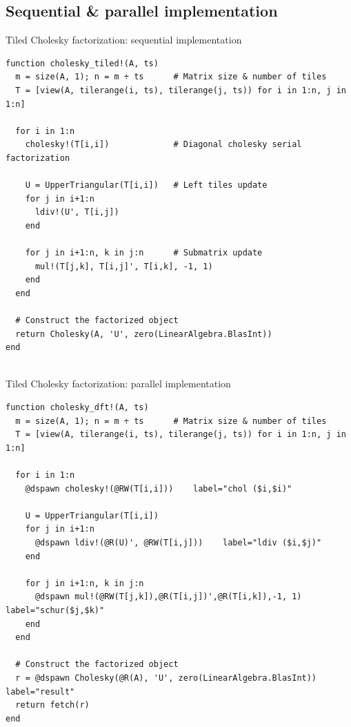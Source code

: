 \documentclass{beamer}
\begin{document}
\subsection{Sequential \& parallel implementation}

\begin{frame}[fragile]{Tiled Cholesky factorization: sequential implementation}
  \begin{verbatim}
function cholesky_tiled!(A, ts)
  m = size(A, 1); n = m ÷ ts      # Matrix size & number of tiles
  T = [view(A, tilerange(i, ts), tilerange(j, ts)) for i in 1:n, j in 1:n]

  for i in 1:n
    cholesky!(T[i,i])             # Diagonal cholesky serial factorization

    U = UpperTriangular(T[i,i])   # Left tiles update
    for j in i+1:n
      ldiv!(U', T[i,j])
    end

    for j in i+1:n, k in j:n      # Submatrix update
      mul!(T[j,k], T[i,j]', T[i,k], -1, 1)
    end
  end

  # Construct the factorized object
  return Cholesky(A, 'U', zero(LinearAlgebra.BlasInt))
end
  
  \end{verbatim}
\end{frame}


\begin{frame}[fragile]{Tiled Cholesky factorization: parallel implementation}
  \begin{verbatim}
function cholesky_dft!(A, ts)
  m = size(A, 1); n = m ÷ ts      # Matrix size & number of tiles
  T = [view(A, tilerange(i, ts), tilerange(j, ts)) for i in 1:n, j in 1:n]

  for i in 1:n
    @dspawn cholesky!(@RW(T[i,i]))    label="chol ($i,$i)"

    U = UpperTriangular(T[i,i])
    for j in i+1:n
      @dspawn ldiv!(@R(U)', @RW(T[i,j]))    label="ldiv ($i,$j)"
    end

    for j in i+1:n, k in j:n
      @dspawn mul!(@RW(T[j,k]),@R(T[i,j])',@R(T[i,k]),-1, 1) label="schur($j,$k)"
    end
  end

  # Construct the factorized object
  r = @dspawn Cholesky(@R(A), 'U', zero(LinearAlgebra.BlasInt)) label="result"
  return fetch(r)
end 
  \end{verbatim}
\end{frame}
\end{document}
